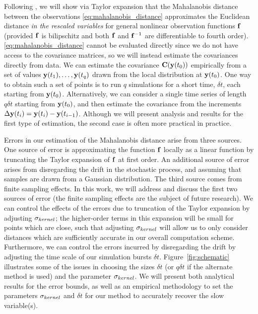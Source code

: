 Following \cite{singer2008non}, we will show via Taylor expansion that the Mahalanobis distance between the observations \eqref{eq:mahalanobis_distance} approximates the Euclidean
distance {\em in the rescaled variables} for general nonlinear observation functions $\mathbf{f}$ (provided $\mathbf{f}$ is bilipschitz and both $\mathbf{f}$ and $\mathbf{f}^{-1}$ are differentiable to fourth order).
%
\eqref{eq:mahalanobis_distance} cannot be evaluated directly since we do not have access to the covariance matrices, so we will instead estimate the covariances directly from data.
%
We can estimate the covariance $\mathbf{C}(\mathbf{y}(t_0))$ empirically from a set of values $\mathbf{y}(t_1), \dots, \mathbf{y}(t_q)$ drawn from the local distribution at $\mathbf{y}(t_0)$.
%
One way to obtain such a set of points is to run $q$ simulations for a short time, $\delta t$, each starting from $\mathbf{y}(t_0)$.
%
Alternatively, we can consider a single time series of length $q \delta t$ starting from $\mathbf{y}(t_0)$, and then estimate the covariance
from the increments $\Delta \mathbf{y}(t_i) = \mathbf{y}(t_i) -\mathbf{y}(t_{i-1})$.
%
Although we will present analysis and results for the first type of estimation, the second case is often more practical in practice.
%

Errors in our estimation of the Mahalanobis distance arise from three sources.
%
One source of error is approximating the function $\mathbf{f}$ locally as a linear function by truncating the Taylor expansion of $\mathbf{f}$ at first order.
%
An additional source of error arises from disregarding the drift in the stochastic process, and assuming that samples are drawn from a Gaussian distribution.
%
The third source comes from finite sampling effects.
%
In this work, we will address and discuss the first two sources of error (the finite sampling effects are the subject of future research).
%
We can control the effects of the errors due to truncation of the Taylor expansion by adjusting $\sigma_{kernel}$; the higher-order terms in this expansion will be small for points which are close, such that adjusting $\sigma_{kernel}$ will allow us to only consider distances which are
sufficiently accurate in our overall computation scheme.
%
Furthermore, we can control the errors incurred by disregarding the drift by adjusting the time scale of our simulation bursts $\delta t$.
%
Figure~\ref{fig:schematic} illustrates some of the issues in choosing the sizes $\delta t$ (or $q \delta t$ if the alternate method is used) and the parameter $\sigma_{kernel}$.
%
We will present both analytical results for the error bounds, as well as an empirical methodology to set the parameters $\sigma_{kernel}$ and $\delta t$ for our method to accurately recover the slow variable(s).

